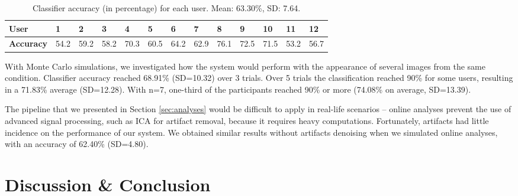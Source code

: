 \documentclass{template/llncs}
\begin{document}
\begin{table}[htbp]
\centering
\caption{Classifier accuracy (in percentage) for each user. Mean: 63.30\%, SD: 7.64.}
\begin{tabular}{l|p{0.5cm} p{0.5cm} p{0.5cm} p{0.5cm} p{0.5cm} p{0.5cm} p{0.5cm} p{0.5cm} p{0.5cm} p{0.5cm} p{0.5cm} p{0.5cm}}
  \textbf{User} & 1 & 2 & 3 & 4 & 5 & 6 & 7 & 8 & 9 & 10 & 11 & 12 \\
  \hline
  \textbf{Accuracy} & 54.2 & 59.2 & 58.2 & 70.3 & 60.5 & 64.2 & 62.9 & 76.1 & 72.5 & 71.5 & 53.2 & 56.7 \\  
\end{tabular}
\label{tab:class}
\end{table}


With Monte Carlo simulations, we investigated how the system would perform with the appearance of several images from the same condition. Classifier accuracy reached 68.91\% (SD=10.32) over 3 trials. Over 5 trials the classification reached 90\% for some users, resulting in a 71.83\% average (SD=12.28). With n=7, one-third of the participants reached 90\% or more (74.08\% on average, SD=13.39).















The pipeline that we presented in Section \ref{sec:analyses} would be difficult to apply in real-life scenarios -- online analyses prevent the use of advanced signal processing, such as ICA for artifact removal, because it requires heavy computations. Fortunately, artifacts had little incidence on the performance of our system.
We obtained similar results without artifacts denoising when we simulated online analyses, with an accuracy of 62.40\% (SD=4.80).

















\section{Discussion \& Conclusion} \label{discussion}\label{conclusion}
\end{document}
